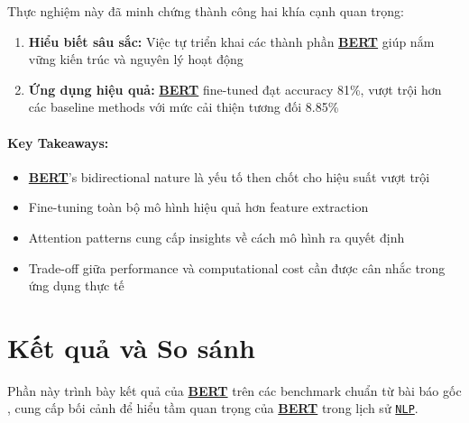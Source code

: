 Thực nghiệm này đã minh chứng thành công hai khía cạnh quan trọng:

\begin{enumerate}
    \item \textbf{Hiểu biết sâu sắc:} Việc tự triển khai các thành phần \hyperref[acro:bert]{\textbf{BERT}} giúp nắm vững kiến trúc và
    nguyên lý hoạt động
    \item \textbf{Ứng dụng hiệu quả:} \hyperref[acro:bert]{\textbf{BERT}} fine-tuned đạt accuracy 81\%, vượt trội hơn các baseline methods với mức cải thiện tương đối 8.85\%
\end{enumerate}

\paragraph{Key Takeaways:}
\begin{itemize}
    \item \hyperref[acro:bert]{\textbf{BERT}}'s bidirectional nature là yếu tố then chốt cho hiệu suất vượt trội
    \item Fine-tuning toàn bộ mô hình hiệu quả hơn feature extraction
    \item Attention patterns cung cấp insights về cách mô hình ra quyết định
    \item Trade-off giữa performance và computational cost cần được cân nhắc trong ứng dụng thực tế
\end{itemize}


\section{Kết quả và So sánh}
\label{sec:ket_qua_so_sanh}
Phần này trình bày kết quả của \hyperref[acro:bert]{\textbf{BERT}} trên các benchmark chuẩn từ bài báo gốc \cite{devlin2018bert}, cung cấp bối cảnh để hiểu tầm quan trọng của \hyperref[acro:bert]{\textbf{BERT}} trong lịch sử \hyperref[acro:nlp]{\texttt{NLP}}.
